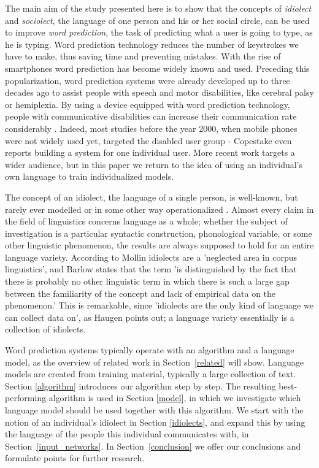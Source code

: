 \documentclass[12pt]{article}
\begin{document}
The main aim of the study presented here is to show that the concepts of \emph{idiolect} and \emph{sociolect}, the language of one person and his or her social circle, can be used to improve \emph{word prediction}, the task of predicting what a user is going to type, as he is typing. Word prediction technology reduces the number of keystrokes we have to make, thus saving time and preventing mistakes. With the rise of smartphones word prediction has become widely known and used. Preceding this popularization, word prediction systems were already developed up to three decades ago to assist people with speech and motor disabilities, like cerebral palsy or hemiplexia. By using a device equipped with word prediction technology, people with communicative disabilities can increase their communication rate considerably \cite{Garay-Vitoria+06}. Indeed, most studies before the year 2000, when mobile phones were not widely used yet, targeted the disabled user group - Copestake \citeyear{copestake97} even reports building a system for one individual user. More recent work targets a wider audience, but in this paper we return to the idea of using an individual's own language to train individualized models.

The concept of an idiolect, the language of a single person, is well-known, but rarely ever modelled or in some other way operationalized \cite{mollin09,barlow10,louwerse04}. Almost every claim in the field of linguistics concerns language as a whole; whether the subject of investigation is a particular syntactic construction, phonological variable, or some other linguistic phenomenon, the results are always supposed to hold for an entire language variety. According to Mollin \citeyear{mollin09} idiolects are a 'neglected area in corpus linguistics', and Barlow \citeyear{barlow10} states that the term 'is distinguished by the fact that there is probably no other linguistic term in which there is such a large gap between the familiarity of the concept and lack of empirical data on the phenomenon.' This is remarkable, since 'idiolects are the only kind of language we can collect data on', as Haugen \citeyear{Haugen72} points out; a language variety essentially is a collection of idiolects.

Word prediction systems typically operate with an algorithm and a language model, as the overview of related work in Section~\ref{related} will show. Language models are created from training material, typically a large collection of text. Section \ref{algorithm} introduces our algorithm step by step. The resulting best-performing algorithm is used in Section \ref{model}, in which we investigate which language model should be used together with this algorithm. We start with the notion of an individual's idiolect in Section \ref{idiolects}, and expand this by using the language of the people this individual communicates with, in Section~\ref{input_networks}. In Section~\ref{conclusion} we offer our conclusions and formulate points for further research.
\end{document}
